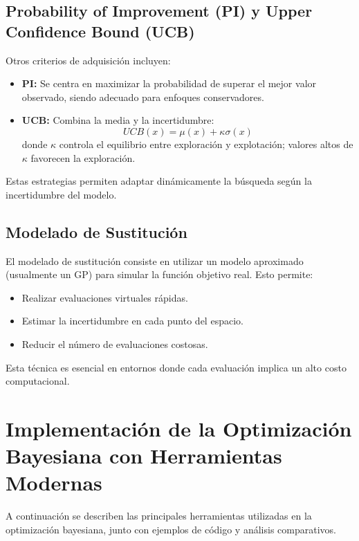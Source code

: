\documentclass[12pt]{article}
\begin{document}
	\subsection{Probability of Improvement (PI) y Upper Confidence Bound (UCB)}
	Otros criterios de adquisición incluyen:
	\begin{itemize}[leftmargin=1.5cm]
		\item \textbf{PI:} Se centra en maximizar la probabilidad de superar el mejor valor observado, siendo adecuado para enfoques conservadores.
		\item \textbf{UCB:} Combina la media y la incertidumbre:
		\[
		UCB(x) = \mu(x) + \kappa \sigma(x)
		\]
		donde \(\kappa\) controla el equilibrio entre exploración y explotación; valores altos de \(\kappa\) favorecen la exploración.
	\end{itemize}
	Estas estrategias permiten adaptar dinámicamente la búsqueda según la incertidumbre del modelo.  
	\lipsum[15]
	
	\subsection{Modelado de Sustitución}
	El modelado de sustitución consiste en utilizar un modelo aproximado (usualmente un GP) para simular la función objetivo real. Esto permite:
	\begin{itemize}[leftmargin=1.5cm]
		\item Realizar evaluaciones virtuales rápidas.
		\item Estimar la incertidumbre en cada punto del espacio.
		\item Reducir el número de evaluaciones costosas.
	\end{itemize}
	Esta técnica es esencial en entornos donde cada evaluación implica un alto costo computacional.  
	\lipsum[16]
	
	\section{Implementación de la Optimización Bayesiana con Herramientas Modernas}
	A continuación se describen las principales herramientas utilizadas en la optimización bayesiana, junto con ejemplos de código y análisis comparativos.
	
\end{document}
